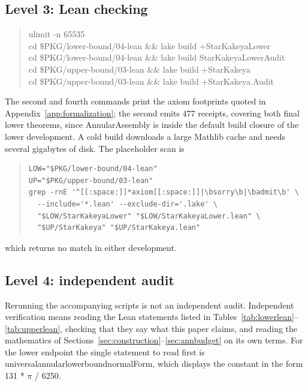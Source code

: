 \documentclass[11pt]{article}
\theoremstyle{plain}
\theoremstyle{definition}
\theoremstyle{remark}
\newcommand{\lean}[1]{%
  \begingroup\ttfamily\hyphenchar\font=-1\relax
  \def\_{\textunderscore\allowbreak}%
  #1\endgroup}
\begin{document}
\subsection*{Level 3: Lean checking}

\begin{quote}\small\ttfamily
ulimit -n 65535\\
cd \$PKG/lower-bound/04-lean \&\& lake build +StarKakeyaLower\\
cd \$PKG/lower-bound/04-lean \&\& lake build StarKakeyaLowerAudit\\
cd \$PKG/upper-bound/03-lean \&\& lake build +StarKakeya\\
cd \$PKG/upper-bound/03-lean \&\& lake build +StarKakeya.Audit
\end{quote}
The second and fourth commands print the axiom footprints quoted in
Appendix~\ref{app:formalization}; the second emits $477$ receipts, covering both
final lower theorems, since \lean{AnnularAssembly} is inside the default build
closure of the lower development. A cold build downloads a large Mathlib cache
and needs several gigabytes of disk. The placeholder scan is
\begin{quote}\small
\begin{verbatim}
LOW="$PKG/lower-bound/04-lean"
UP="$PKG/upper-bound/03-lean"
grep -rnE '^[[:space:]]*axiom[[:space:]]|\bsorry\b|\badmit\b' \
  --include='*.lean' --exclude-dir='.lake' \
  "$LOW/StarKakeyaLower" "$LOW/StarKakeyaLower.lean" \
  "$UP/StarKakeya" "$UP/StarKakeya.lean"
\end{verbatim}
\end{quote}
which returns no match in either development.

\subsection*{Level 4: independent audit}

Rerunning the accompanying scripts is not an independent audit. Independent
verification means reading the Lean statements listed in
Tables~\ref{tab:lowerlean}--\ref{tab:upperlean}, checking
that they say what this paper claims, and reading the mathematics of
Sections~\ref{sec:construction}--\ref{sec:annbudget} on its own terms. For the
lower endpoint the single statement to read first is
\lean{universal\_annular\_lower\_bound\_normalForm}, which displays the constant
in the form \lean{131 * $\pi$ / 6250}.
\end{document}
